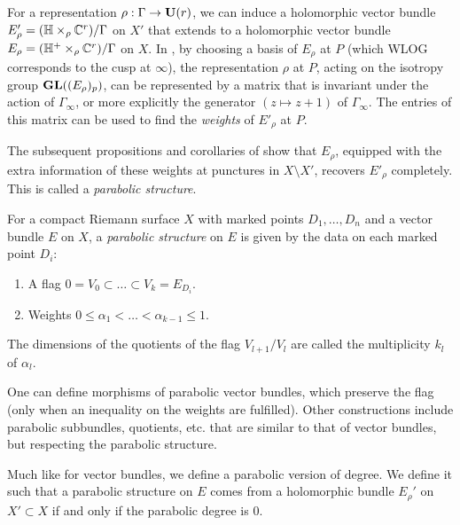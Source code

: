 For a representation $\rho:\Gamma\rightarrow\mathbf{U}(r)$, we can induce a holomorphic vector bundle $E'_\rho=(\mathbb{H}\times_\rho\mathbb{C}^r)/\Gamma$ on $X'$ that extends to a holomorphic vector bundle $E_\rho=(\mathbb{H}^+\times_\rho\mathbb{C}^r)/\Gamma$ on $X$.
In \cite[Section 1]{mehtasesh}, by choosing a basis of $E_\rho$ at $P$ (which WLOG corresponds to the cusp at $\infty$), the representation $\rho$ at $P$, acting on the isotropy group $\mathbf{GL}((E_\rho)_p)$, can be represented by a matrix that is invariant under the action of $\Gamma_\infty$, or more explicitly the generator $(z\mapsto z+1)$ of $\Gamma_\infty$. The entries of this matrix can be used to find the \textit{weights} of $E'_\rho$ at $P$.

The subsequent propositions and corollaries of \cite[Section 1]{mehtasesh} show that $E_\rho$, equipped with the extra information of these weights at punctures in $X\setminus X'$, recovers $E'_\rho$ completely. This is called a \textit{parabolic structure}.

\begin{definition}
    For a compact Riemann surface $X$ with marked points $D_1,\ldots,D_n$ and a vector bundle $E$ on $X$, a \textit{parabolic structure} on $E$ is given by the data on each marked point $D_i$:
    \begin{enumerate}[label=(\alph*)]
        \item A flag $0=V_0\subset\ldots\subset V_k=E_{D_i}$.
        \item Weights $0\leq\alpha_1<\ldots<\alpha_{k-1}\leq1$.
    \end{enumerate}
    The dimensions of the quotients of the flag $V_{l+1}/V_{l}$ are called the multiplicity $k_l$ of $\alpha_l$.
\end{definition}

One can define morphisms of parabolic vector bundles, which preserve the flag (only when an inequality on the weights are fulfilled). Other constructions include parabolic subbundles, quotients, etc. that are similar to that of vector bundles, but respecting the parabolic structure.

Much like for vector bundles, we define a parabolic version of degree. We define it such that a parabolic structure on $E$ comes from a holomorphic bundle $E_\rho'$ on $X'\subset X$ if and only if the parabolic degree is $0$.

